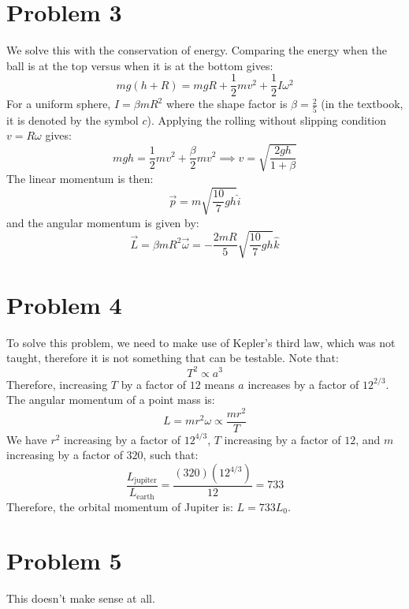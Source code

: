 \documentclass{article}
\begin{document}
\section*{Problem 3}
We solve this with the conservation of energy. Comparing the energy when the ball is at the top versus when it is at the bottom gives:
\begin{equation}
    mg(h+R)=mgR + \frac{1}{2}mv^2 + \frac{1}{2}I\omega^2
    \label{eq:}
\end{equation}
For a uniform sphere, $I=\beta mR^2$ where the shape factor is $\beta=\frac{2}{5}$ (in the textbook, it is denoted by the symbol $c$). Applying the rolling without slipping condition $v=R\omega$ gives:
\begin{equation}
    mgh = \frac{1}{2}mv^2 + \frac{\beta}{2}mv^2 \implies v = \sqrt{\frac{2gh}{1+\beta}}
    \label{eq:}
\end{equation}
The linear momentum is then:
\begin{equation}
    \vec{p} = m\sqrt{\frac{10}{7}gh} \hat{i}
    \label{eq:}
\end{equation}
and the angular momentum is given by:
\begin{equation}
    \vec{L} = \beta mR^2\vec{\omega} = -\frac{2mR}{5}\sqrt{\frac{10}{7}gh} \hat{k}
    \label{eq:}
\end{equation}
\section*{Problem 4}
To solve this problem, we need to make use of Kepler's third law, which was not taught, therefore it is not something that can be testable. Note that:
\begin{equation}
    T^2 \propto a^3
    \label{eq:}
\end{equation}
Therefore, increasing $T$ by a factor of $12$ means $a$ increases by a factor of $12^{2/3}$. The angular momentum of a point mass is:
\begin{equation}
    L = mr^2\omega \propto \frac{mr^2}{T}
    \label{eq:}
\end{equation}
We have $r^2$ increasing by a factor of $12^{4/3}$, $T$ increasing by a factor of $12$, and $m$ increasing by a factor of $320$, such that:
\begin{equation}
    \frac{L_\text{jupiter}}{L_\text{earth}} = \frac{(320)(12^{4/3})}{12}=733
    \label{eq:}
\end{equation}
Therefore, the orbital momentum of Jupiter is: $L=733L_0.$
\section*{Problem 5}
This doesn't make sense at all.
\end{document}
